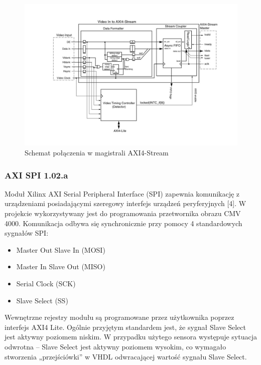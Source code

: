 \documentclass[a4paper,11pt,oneside]{report}  %
\begin{document}
\begin{figure}[H]
	\centering
	\includegraphics[width=16cm]{data4.png}
	\caption{Schemat połączenia w magistrali AXI4-Stream}
	\label{fig:Zynq3}
\end{figure}

\subsubsection{AXI SPI 1.02.a}
Moduł Xilinx AXI Serial Peripheral Interface (SPI) zapewnia komunikację z urządzeniami posiadającymi szeregowy interfejs urządzeń peryferyjnych [4]. W projekcie wykorzystywany jest do programowania przetwornika obrazu CMV 4000. Komunikacja odbywa się synchronicznie przy pomocy 4 standardowych sygnałów SPI:
\begin{itemize}
\item Master Out Slave In (MOSI)
\item Master In Slave Out (MISO)
\item Serial Clock (SCK)
\item Slave Select (SS)
\end{itemize}

Wewnętrzne rejestry modułu są programowane przez użytkownika poprzez interfejs AXI4 Lite. Ogólnie przyjętym standardem jest, że sygnał Slave Select jest aktywny poziomem niskim. W przypadku użytego sensora występuje sytuacja odwrotna – Slave Select jest aktywny poziomem wysokim, co wymagało stworzenia „przejściówki” w VHDL odwracającej wartość sygnału Slave Select.
\end{document}
